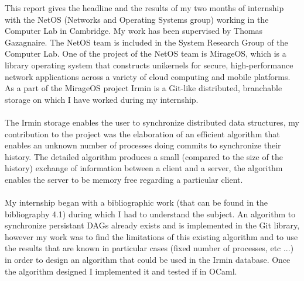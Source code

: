 This report gives the headline and the results of my two months of internship with the NetOS (Networks and Operating Systems group) working in the Computer Lab in Cambridge. My work has been supervised by Thomas Gazagnaire. The NetOS team is included in the System Research Group of the Computer Lab. One of the project of the NetOS team is MirageOS, which is a library operating system that constructs unikernels for secure, high-performance network applications across a variety of cloud computing and mobile platforms. As a part of the MirageOS project Irmin is a Git-like distributed, branchable storage on which I have worked during my internship.
\paragraph{} The Irmin storage enables the user to synchronize distributed data structures, my contribution to the project was the elaboration of an efficient algorithm that enables an unknown number of processes doing commits to synchronize their history. The detailed algorithm produces a small (compared to the size of the history) exchange of information between a client and a server, the algorithm enables the server to be memory free regarding a particular client. 
\paragraph{} My internship began with a bibliographic work (that can be found in the bibliography 4.1) during which I had to understand the subject. An algorithm to synchronize persistant DAGs already exists and is implemented in the Git library, however my work was to find the limitations of this existing algorithm and to use the results that are known in particular cases (fixed number of processes, etc ...) in order to design an algorithm that could be used in the Irmin database. Once the algorithm designed I implemented it and tested if in OCaml.